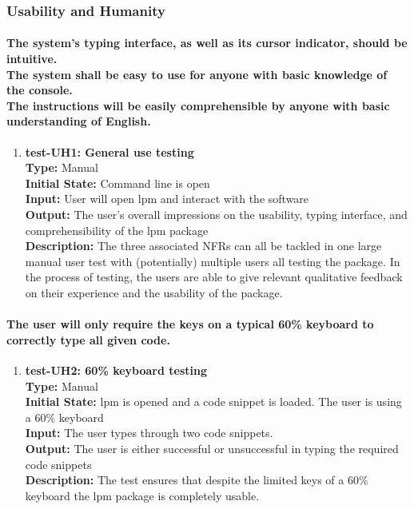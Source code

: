 \documentclass[12pt, titlepage]{article}
\begin{document}
\subsubsection{Usability and Humanity}
\paragraph{The system’s typing interface, as well as its cursor indicator, should be intuitive.\\
The system shall be easy to use for anyone with basic knowledge of the console.\\
The instructions will be easily comprehensible by anyone with basic understanding of English.\\}
\begin{enumerate}
\item{\textbf{test-UH1: General use testing}\\}
    \textbf{Type:} Manual\\
    \textbf{Initial State:}  Command line is open\\
    \textbf{Input:} User will open lpm and interact with the software\\
    \textbf{Output:} The user's overall impressions on the usability, typing interface, and comprehensibility of the lpm package \\
    \textbf{Description: } The three associated NFRs can all be tackled in one large manual user test with (potentially) multiple users all testing the package. In the process of testing, the users are able to give relevant qualitative feedback on their experience and the usability of the package. \\
\end{enumerate}

\paragraph{The user will only require the keys on a typical 60\% keyboard to correctly type all given code.}
\begin{enumerate}
    \item{\textbf{test-UH2: 60\% keyboard testing}\\}
    \textbf{Type:} Manual\\
    \textbf{Initial State:}  lpm is opened and a code snippet is loaded. The user is using a 60\% keyboard\\
    \textbf{Input:} The user types through two code snippets. \\
    \textbf{Output:} The user is either successful or unsuccessful in typing the required code snippets\\
    \textbf{Description:} The test ensures that despite the limited keys of a 60\% keyboard the lpm package is completely usable. \\
\end{enumerate}
\end{document}
